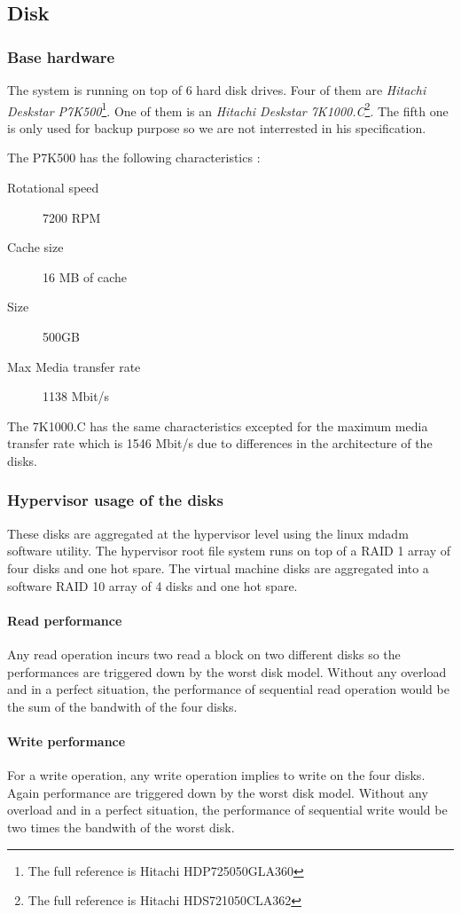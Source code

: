 \subsection{Disk}
\subsubsection{Base hardware}
The system is running on top of 6 hard disk drives.
Four of them are \emph{Hitachi Deskstar P7K500}\footnote{The full reference is
Hitachi HDP725050GLA360}.
One of them is an \emph{Hitachi Deskstar 7K1000.C}\footnote{The full reference
is Hitachi HDS721050CLA362}.
The fifth one is only used for backup purpose so we are not interrested in his
specification.

The P7K500 has the following characteristics \cite{p7k500} :
\begin{description}
\item[Rotational speed] 7200 RPM
\item[Cache size] 16 MB of cache
\item[Size] 500GB
\item[Max Media transfer rate] 1138 Mbit/s
\end{description}
The 7K1000.C has the same characteristics \cite{7K1000.C} excepted for the maximum media transfer
rate which is 1546 Mbit/s due to differences in the architecture of the disks.

\subsubsection{Hypervisor usage of the disks}
These disks are aggregated at the hypervisor level using the linux mdadm
software utility.
The hypervisor root file system runs on top of a RAID 1 array of four disks and
one hot spare.
The virtual machine disks are aggregated into a software RAID 10 array of 4 disks and one hot spare.

\paragraph{Read performance}
Any read operation incurs two read a block on two different disks so the
performances are triggered down by the worst disk model.
Without any overload and in a perfect situation, the performance of sequential read
operation would be the sum of the bandwith of the four disks.

\paragraph{Write performance}
For a write operation, any write operation implies to write on the four disks.
Again performance are triggered down by the worst disk model.
Without any overload and in a perfect situation, the performance of sequential
write would be two times the bandwith of the worst disk.



